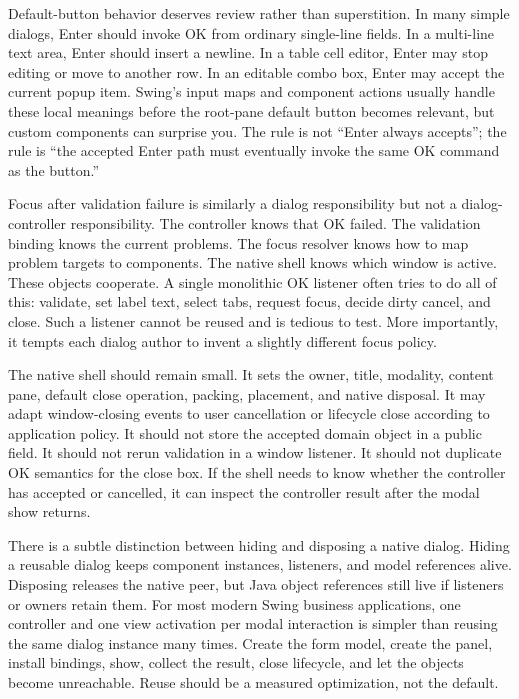 Default-button behavior deserves review rather than superstition. In many
simple dialogs, Enter should invoke OK from ordinary single-line fields. In a
multi-line text area, Enter should insert a newline. In a table cell editor,
Enter may stop editing or move to another row. In an editable combo box, Enter
may accept the current popup item. Swing's input maps and component actions
usually handle these local meanings before the root-pane default button becomes
relevant, but custom components can surprise you. The rule is not ``Enter
always accepts''; the rule is ``the accepted Enter path must eventually invoke
the same OK command as the button.''

Focus after validation failure is similarly a dialog responsibility but not a
dialog-controller responsibility. The controller knows that OK failed. The
validation binding knows the current problems. The focus resolver knows how to
map problem targets to components. The native shell knows which window is
active. These objects cooperate. A single monolithic OK listener often tries to
do all of this: validate, set label text, select tabs, request focus, decide
dirty cancel, and close. Such a listener cannot be reused and is tedious to
test. More importantly, it tempts each dialog author to invent a slightly
different focus policy.

The native  shell should remain small. It sets the owner, title,
modality, content pane, default close operation, packing, placement, and native
disposal. It may adapt window-closing events to user cancellation or lifecycle
close according to application policy. It should not store the accepted domain
object in a public field. It should not rerun validation in a window listener.
It should not duplicate OK semantics for the close box. If the shell needs to
know whether the controller has accepted or cancelled, it can inspect the
controller result after the modal show returns.

There is a subtle distinction between hiding and disposing a native dialog.
Hiding a reusable dialog keeps component instances, listeners, and model
references alive. Disposing releases the native peer, but Java object
references still live if listeners or owners retain them. For most modern Swing
business applications, one controller and one view activation per modal
interaction is simpler than reusing the same dialog instance many times. Create
the form model, create the panel, install bindings, show, collect the result,
close lifecycle, and let the objects become unreachable. Reuse should be a
measured optimization, not the default.

